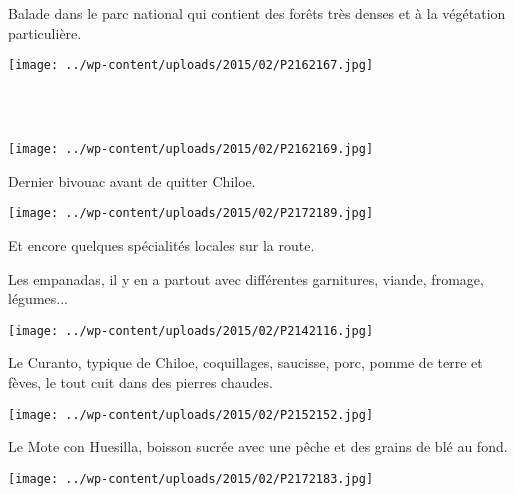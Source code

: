 \pagebreak
 Balade dans le parc national qui contient des forêts très denses et à la végétation particulière.
 \vspace{-2mm}
\begin{center} \texttt{[image: ../wp-content/uploads/2015/02/P2162167.jpg]} \end{center}
~\\
~
\vspace{3mm}
\begin{center} \texttt{[image: ../wp-content/uploads/2015/02/P2162169.jpg]} \end{center}
\vspace{-\topsep}

\pagebreak
  Dernier bivouac avant de quitter Chiloe.\\
\begin{center} \texttt{[image: ../wp-content/uploads/2015/02/P2172189.jpg]} \end{center}

 Et encore quelques spécialités locales sur la route.

 Les empanadas, il y en a partout avec différentes garnitures, viande, fromage, légumes...
\begin{center} \texttt{[image: ../wp-content/uploads/2015/02/P2142116.jpg]} \end{center}
\vspace{-\topsep}

\pagebreak
 Le Curanto, typique de Chiloe, coquillages, saucisse, porc, pomme de terre et fèves, le tout cuit dans des pierres chaudes.
 \vfill
 \begin{center} \texttt{[image: ../wp-content/uploads/2015/02/P2152152.jpg]} \end{center}

\vfill
 Le Mote con Huesilla, boisson sucrée avec une pêche et des grains de blé au fond.
 \vfill
\begin{center} \texttt{[image: ../wp-content/uploads/2015/02/P2172183.jpg]} \end{center}
\vspace{-\topsep}
\vspace{-0.75mm}
